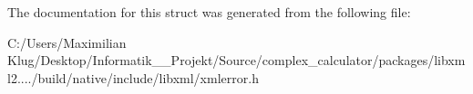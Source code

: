 The documentation for this struct was generated from the following file\+:\begin{DoxyCompactItemize}
\item 
C\+:/\+Users/\+Maximilian Klug/\+Desktop/\+Informatik\+\_\+\_\+\+Projekt/\+Source/complex\+\_\+calculator/packages/libxml2..../build/native/include/libxml/xmlerror.\+h\end{DoxyCompactItemize}
